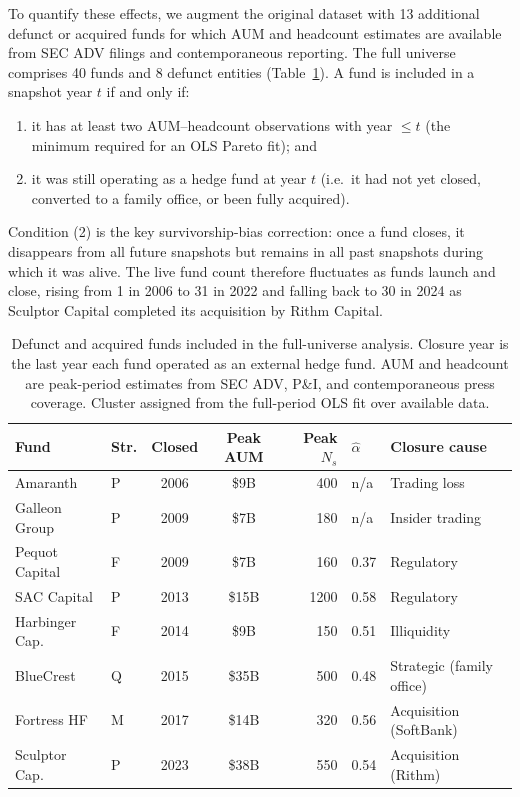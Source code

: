 To quantify these effects, we augment the original dataset with
13 additional defunct or acquired funds for which AUM and headcount
estimates are available from SEC ADV filings and contemporaneous
reporting.
The full universe comprises 40 funds and 8 defunct entities
(Table~\ref{tab:defunct}).
A fund is included in a snapshot year $t$ if and only if:
\begin{enumerate}\setlength\itemsep{1pt}
  \item it has at least two AUM--headcount observations with
        year $\le t$ (the minimum required for an OLS Pareto fit); and
  \item it was still operating as a hedge fund at year $t$
        (i.e.\ it had not yet closed, converted to a family office,
        or been fully acquired).
\end{enumerate}
Condition (2) is the key survivorship-bias correction: once a fund
closes, it disappears from all future snapshots but remains in all
past snapshots during which it was alive.
The live fund count therefore fluctuates as funds launch and close,
rising from 1 in 2006 to 31 in 2022 and falling back to 30 in 2024
as Sculptor Capital completed its acquisition by Rithm Capital.

\begin{table}[htbp]
\caption{\label{tab:defunct}
  Defunct and acquired funds included in the full-universe analysis.
  Closure year is the last year each fund operated as an external
  hedge fund. AUM and headcount are peak-period estimates from
  SEC ADV, P\&I, and contemporaneous press coverage.
  Cluster assigned from the full-period OLS fit over available data.
}
\setlength{\tabcolsep}{5pt}
\begin{tabular}{@{}llccrll@{}}
\toprule
Fund & Str. & Closed & Peak AUM & Peak $N_s$ & $\hat\alpha$ & Closure cause \\
\midrule
Amaranth        & P & 2006 & \$9B   & 400  & n/a  & Trading loss \\
Galleon Group   & P & 2009 & \$7B   & 180  & n/a  & Insider trading \\
Pequot Capital  & F & 2009 & \$7B   & 160  & 0.37 & Regulatory \\
SAC Capital     & P & 2013 & \$15B  & 1200 & 0.58 & Regulatory \\
Harbinger Cap.  & F & 2014 & \$9B   & 150  & 0.51 & Illiquidity \\
BlueCrest       & Q & 2015 & \$35B  & 500  & 0.48 & Strategic (family office) \\
Fortress HF     & M & 2017 & \$14B  & 320  & 0.56 & Acquisition (SoftBank) \\
Sculptor Cap.   & P & 2023 & \$38B  & 550  & 0.54 & Acquisition (Rithm) \\
\bottomrule
\end{tabular}
\end{table}

